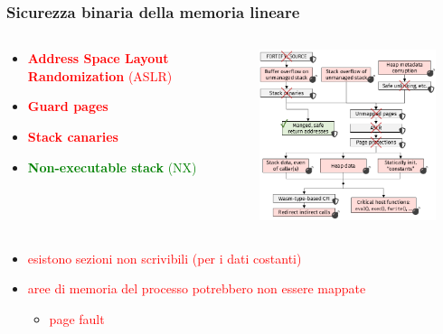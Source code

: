 \documentclass{beamer}
\begin{document}
\begin{frame}
  \frametitle{Sicurezza binaria della memoria lineare} 
  \begin{columns}
    \begin{column}{0.5\textwidth}
  \begin{itemize}
    \item \textcolor{red}{\textbf{Address Space Layout Randomization} (ASLR)} 
    \pause
    \item \textcolor{red}{\textbf{Guard pages}}   
    \pause
    \item \textcolor{red}{\textbf{Stack canaries}}
    \pause 
    \item \textcolor{green}{\textbf{Non-executable stack} (NX)}
    
      \pause
    \end{itemize}
    \end{column}
    \begin{column}{0.5\textwidth}
      \centerline{\includegraphics[width=10cm,height=5cm,keepaspectratio]{images/mitigations.png}}
    \end{column}
  \end{columns}

  \vspace{0.15in}
    \begin{itemize}
    \item \textcolor{red}{esistono sezioni non scrivibili (per i dati
      costanti)}
    \pause
    \item \textcolor{red}{aree di memoria del processo potrebbero non essere
    mappate}
      \begin{itemize}
        \item \textcolor{red}{page fault}
      \end{itemize}
  \end{itemize}
\end{frame}
\end{document}
